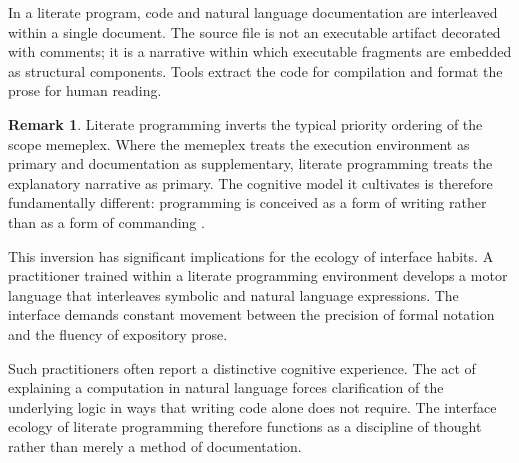 \documentclass[11pt]{article}
\theoremstyle{definition}
\newtheorem{remark}{Remark}[section]
\begin{document}
In a literate program, code and natural language documentation are
interleaved within a single document. The source file is not an
executable artifact decorated with comments; it is a narrative within
which executable fragments are embedded as structural components. Tools
extract the code for compilation and format the prose for human reading.

\begin{remark}
Literate programming inverts the typical priority ordering of the scope
memeplex. Where the memeplex treats the execution environment as primary
and documentation as supplementary, literate programming treats the
explanatory narrative as primary. The cognitive model it cultivates is
therefore fundamentally different: programming is conceived as a form
of writing rather than as a form of commanding \cite{knuth1984}.
\end{remark}

This inversion has significant implications for the ecology of interface
habits. A practitioner trained within a literate programming environment
develops a motor language that interleaves symbolic and natural language
expressions. The interface demands constant movement between the
precision of formal notation and the fluency of expository prose.

Such practitioners often report a distinctive cognitive experience.
The act of explaining a computation in natural language forces
clarification of the underlying logic in ways that writing code alone
does not require. The interface ecology of literate programming therefore
functions as a discipline of thought rather than merely a method of
documentation.
\end{document}
